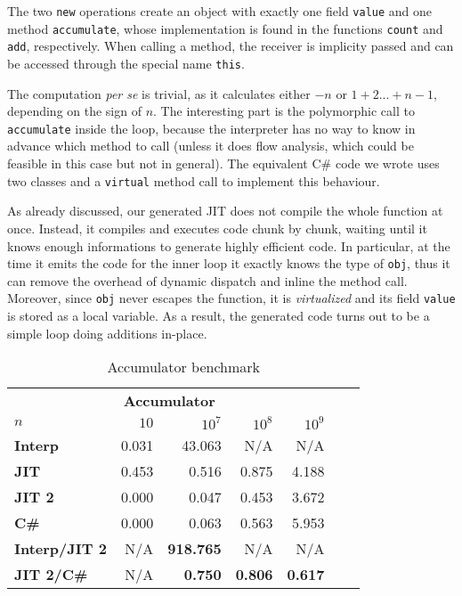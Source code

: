 The two \lstinline{new} operations create an object with exactly one field
\lstinline{value} and one method \lstinline{accumulate}, whose implementation
is found in the functions \lstinline{count} and \lstinline{add}, respectively.
When calling a method, the receiver is implicity passed and can be accessed
through the special name \lstinline{this}.

The computation \emph{per se} is trivial, as it calculates either $-n$ or
$1+2...+n-1$, depending on the sign of $n$. The interesting part is the
polymorphic call to \lstinline{accumulate} inside the loop, because the interpreter has
no way to know in advance which method to call (unless it does flow analysis,
which could be feasible in this case but not in general).  The equivalent C\#
code we wrote uses two classes and a \lstinline{virtual} method call to
implement this behaviour.

As already discussed, our generated JIT does not compile the whole function at
once. Instead, it compiles and executes code chunk by chunk, waiting until it
knows enough informations to generate highly efficient code.  In particular,
at the time it emits the code for the inner loop it exactly knows the
type of \lstinline{obj}, thus it can remove the overhead of dynamic dispatch
and inline the method call.  Moreover, since \lstinline{obj} never escapes the
function, it is \emph{virtualized} and its field \lstinline{value} is stored
as a local variable.  As a result, the generated code turns out to be a simple loop
doing additions in-place.

\begin{table}[ht]
  \begin{center}

  \begin{tabular}{l|rrrrrr}
    \multicolumn{5}{c}{\textbf{Accumulator}} \\ [0.5ex]

    \textbf{$n$}          & $10$  & $10^7$           & $10^8$         & $10^9$         \\
    \hline
    \textbf{Interp}       & 0.031 & 43.063           & N/A            & N/A            \\
    \textbf{JIT}          & 0.453 &  0.516           & 0.875          & 4.188          \\
    \textbf{JIT 2}        & 0.000 &  0.047           & 0.453          & 3.672          \\
    \textbf{C\#}          & 0.000 &  0.063           & 0.563          & 5.953          \\
    \textbf{Interp/JIT 2} & N/A   & \textbf{918.765} & N/A            & N/A            \\
    \textbf{JIT 2/C\#}    & N/A   & \textbf{0.750}   & \textbf{0.806} & \textbf{0.617} \\

  \end{tabular}
  \end{center}
  \caption{Accumulator benchmark}
  \label{tab:accumulator}
\end{table}





